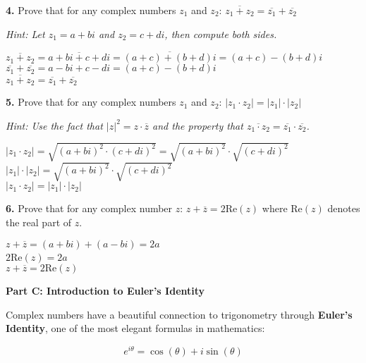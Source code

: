 \documentclass[12pt]{article}
\begin{document}
\textbf{4.} Prove that for any complex numbers $z_1$ and $z_2$: $\overline{z_1 + z_2} = \overline{z_1} + \overline{z_2}$

\textit{Hint: Let $z_1 = a + bi$ and $z_2 = c + di$, then compute both sides.}
\\[8pt]
\begin{minipage}[t][3cm][t]{\linewidth}
    $\displaystyle \overline{z_1+z_2} = \overline{a+bi+c+di} = \overline{(a+c)+(b+d)i} = (a+c)-(b+d)i$
    \\[8pt] $\overline{z_1}+\overline{z_2} = a-bi+c-di = (a+c)-(b+d)i$
    \\[8pt] $\overline{z_1+z_2} = \overline{z_1}+\overline{z_2}$
\end{minipage}

\newpage

\textbf{5.} Prove that for any complex numbers $z_1$ and $z_2$: $|z_1 \cdot z_2| = |z_1| \cdot |z_2|$

\textit{Hint: Use the fact that $|z|^2 = z \cdot \overline{z}$ and the property that $\overline{z_1 \cdot z_2} = \overline{z_1} \cdot \overline{z_2}$.}
\\[8pt]
\begin{minipage}[t][6cm][t]{\linewidth}
    $\displaystyle |z_1 \cdot z_2| = \sqrt{(a+bi)^2 \cdot (c+di)^2} = \sqrt{(a+bi)^2} \cdot \sqrt{(c+di)^2}$
    \\[8pt] $|z_1| \cdot |z_2| = \sqrt{(a+bi)^2} \cdot \sqrt{(c+di)^2}$
    \\[8pt] $|z_1 \cdot z_2| = |z_1| \cdot |z_2|$
\end{minipage}

\textbf{6.} Prove that for any complex number $z$: $z + \overline{z} = 2 \text{Re}(z)$
where $\text{Re}(z)$ denotes the real part of $z$.
\\[8pt]
\begin{minipage}[t][4cm][t]{\linewidth}
    $\displaystyle z + \overline{z} = (a+bi)+(a-bi) = 2a$
    \\[8pt] $2$Re$(z) = 2a$
    \\[8pt] $z + \overline{z} = 2 \text{Re}(z)$
\end{minipage}

\textbf{Part C: Introduction to Euler's Identity}

Complex numbers have a beautiful connection to trigonometry through \textbf{Euler's Identity}, one of the most elegant formulas in mathematics:

$$e^{i\theta} = \cos(\theta) + i\sin(\theta)$$
\end{document}
